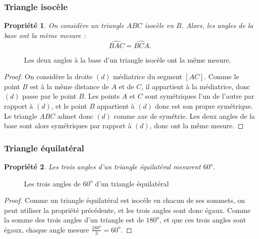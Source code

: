 \documentclass[12 pt]{article}
\theoremstyle{plain}
\newcounter{n}
\numberwithin{n}{section}
\newtheorem*{prop}{Propriété}
\begin{document}
\subsubsection{Triangle isocèle}
\begin{prop}
On considère un triangle $ABC$ isocèle en $B$. Alors, les angles de la base ont la même mesure : 
\[ \widehat{BAC}= \widehat{BCA}.\]
\end{prop}
\begin{figure}[H]\center
{}\caption{Les deux angles à la base d'un triangle isocèle ont la même mesure. }
\end{figure}
\begin{proof}
On considère la droite $(d)$ médiatrice du segment $[AC]$. Comme le point $B$ est à la même distance de $A$ et 
de $C$, il appartient à la médiatrice, donc $(d)$ passe par le point $B$. Les points $A$ et $C$ sont symétriques l'un
de l'autre par rapport à $(d)$, et le point $B$ appartient à $(d)$ donc est son propre symétrique. Le triangle $ABC$ 
admet donc $(d)$ comme axe de symétrie. Les deux angles de la base sont alors symétriques par rapport à $(d)$, 
donc ont la même mesure. 
\end{proof}
\subsubsection{Triangle équilatéral}

\begin{prop}
Les trois angles d'un triangle équilatéral mesurent $60^o$. 
\end{prop}
\begin{figure}[H]\center
{}\caption{Les trois angles de $60^o$ d'un triangle équilatéral}
\end{figure}
\begin{proof}
Comme un triangle équilatéral est isocèle en chacun de ses sommets, 
on peut utiliser la propriété précédente, et les trois angles sont donc égaux. 
Comme la somme des trois angles d'un triangle est de $180^o$, et que ces trois angles sont égaux, 
chaque angle mesure $\frac{180^o}3 = 60^o$. 
\end{proof}
\end{document}
